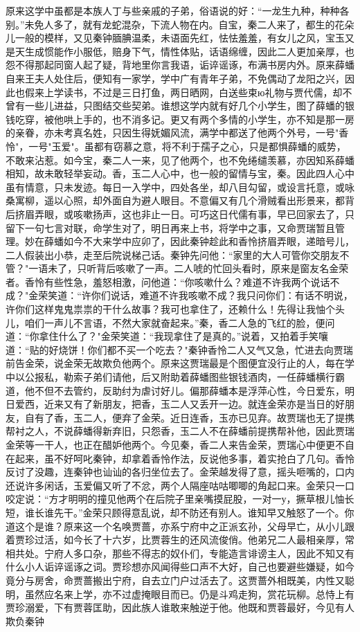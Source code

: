 原来这学中虽都是本族人丁与些亲戚的子弟，俗语说的好：“一龙生九种，种种各别。”未免人多了，就有龙蛇混杂，下流人物在内。自宝，秦二人来了，都生的花朵儿一般的模样，又见秦钟腼腆温柔，未语面先红，怯怯羞羞，有女儿之风，宝玉又是天生成惯能作小服低，赔身下气，情性体贴，话语绵缠，因此二人更加亲厚，也怨不得那起同窗人起了疑，背地里你言我语，诟谇谣诼，布满书房内外。原来薛蟠自来王夫人处住后，便知有一家学，学中广有青年子弟，不免偶动了龙阳之兴，因此也假来上学读书，不过是三日打鱼，两日晒网，白送些束ю礼物与贾代儒，却不曾有一些儿进益，只图结交些契弟。谁想这学内就有好几个小学生，图了薛蟠的银钱吃穿，被他哄上手的，也不消多记。更又有两个多情的小学生，亦不知是那一房的亲眷，亦未考真名姓，只因生得妩媚风流，满学中都送了他两个外号，一号"香怜"，一号"玉爱"。虽都有窃慕之意，将不利于孺子之心，只是都惧薛蟠的威势，不敢来沾惹。如今宝，秦二人一来，见了他两个，也不免绻缱羡慕，亦因知系薛蟠相知，故未敢轻举妄动。香，玉二人心中，也一般的留情与宝，秦。因此四人心中虽有情意，只未发迹。每日一入学中，四处各坐，却八目勾留，或设言托意，或咏桑寓柳，遥以心照，却外面自为避人眼目。不意偏又有几个滑贼看出形景来，都背后挤眉弄眼，或咳嗽扬声，这也非止一日。可巧这日代儒有事，早已回家去了，只留下一句七言对联，命学生对了，明日再来上书，将学中之事，又命贾瑞暂且管理。妙在薛蟠如今不大来学中应卯了，因此秦钟趁此和香怜挤眉弄眼，递暗号儿，二人假装出小恭，走至后院说梯己话。秦钟先问他：“家里的大人可管你交朋友不管？"一语未了，只听背后咳嗽了一声。二人唬的忙回头看时，原来是窗友名金荣者。香怜有些性急，羞怒相激，问他道：“你咳嗽什么？难道不许我两个说话不成？"金荣笑道：“许你们说话，难道不许我咳嗽不成？我只问你们：有话不明说，许你们这样鬼鬼祟祟的干什么故事？我可也拿住了，还赖什么！先得让我怞个头儿，咱们一声儿不言语，不然大家就奋起来。”秦，香二人急的飞红的脸，便问道：“你拿住什么了？"金荣笑道：“我现拿住了是真的。”说着，又拍着手笑嚷道：“贴的好烧饼！你们都不买一个吃去？"秦钟香怜二人又气又急，忙进去向贾瑞前告金荣，说金荣无故欺负他两个。原来这贾瑞最是个图便宜没行止的人，每在学中以公报私，勒索子弟们请他，后又附助着薛蟠图些银钱酒肉，一任薛蟠横行霸道，他不但不去管约，反助纣为虐讨好儿。偏那薛蟠本是浮萍心性，今日爱东，明日爱西，近来又有了新朋友，把香，玉二人又丢开一边。就连金荣亦是当日的好朋友，自有了香，玉二人，便弃了金荣。近日连香，玉亦已见弃。故贾瑞也无了提携帮衬之人，不说薛蟠得新弃旧，只怨香，玉二人不在薛蟠前提携帮补他，因此贾瑞金荣等一干人，也正在醋妒他两个。今见秦，香二人来告金荣，贾瑞心中便更不自在起来，虽不好呵叱秦钟，却拿着香怜作法，反说他多事，着实抢白了几句。香怜反讨了没趣，连秦钟也讪讪的各归坐位去了。金荣越发得了意，摇头咂嘴的，口内还说许多闲话，玉爱偏又听了不忿，两个人隔座咕咕唧唧的角起口来。金荣只一口咬定说：“方才明明的撞见他两个在后院子里亲嘴摸屁股，一对一у，撅草根儿怞长短，谁长谁先干。”金荣只顾得意乱说，却不防还有别人。谁知早又触怒了一个。你道这个是谁？原来这一个名唤贾蔷，亦系宁府中之正派玄孙，父母早亡，从小儿跟着贾珍过活，如今长了十六岁，比贾蓉生的还风流俊俏。他弟兄二人最相亲厚，常相共处。宁府人多口杂，那些不得志的奴仆们，专能造言诽谤主人，因此不知又有什么小人诟谇谣诼之词。贾珍想亦风闻得些口声不大好，自己也要避些嫌疑，如今竟分与房舍，命贾蔷搬出宁府，自去立门户过活去了。这贾蔷外相既美，内性又聪明，虽然应名来上学，亦不过虚掩眼目而已。仍是斗鸡走狗，赏花玩柳。总恃上有贾珍溺爱，下有贾蓉匡助，因此族人谁敢来触逆于他。他既和贾蓉最好，今见有人欺负秦钟